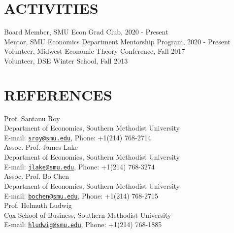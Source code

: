 \documentclass[11pt]{res}
\begin{document}
\begin{resume}
\section{ACTIVITIES}\vspace{2mm}
Board Member, SMU Econ Grad Club, 2020 - Present\vspace{1.5mm}\\
Mentor, SMU Economics Department Mentorship Program, 2020 - Present\vspace{1.5mm}\\
Volunteer, Midwest Economic Theory Conference, Fall 2017\vspace{1.5mm}\\
Volunteer, DSE Winter School, Fall 2013

\section{REFERENCES}\vspace{2mm}
Prof. Santanu Roy\\
Department of Economics, Southern Methodist University\\
E-mail: \href{mailto:sroy@smu.edu}{\texttt{sroy@smu.edu}}, Phone: +1(214) 768-2714\\

\vspace{-5 mm} Assoc. Prof. James Lake\\
Department of Economics, Southern Methodist University\\
E-mail: \href{mailto:jlake@smu.edu}{\texttt{jlake@smu.edu}}, Phone: +1(214) 768-3274\\

\vspace{-5 mm} Assoc. Prof. Bo Chen\\
Department of Economics, Southern Methodist University\\
E-mail: \href{mailto:bochen@smu.edu}{\texttt{bochen@smu.edu}}, Phone: +1(214) 768-2715\\

\vspace{-5 mm} Prof. Helmuth Ludwig\\
Cox School of Business, Southern Methodist University\\
E-mail: \href{mailto:hludwig@smu.edu}{\texttt{hludwig@smu.edu}}, Phone: +1(214) 768-1885\\






\end{resume}
\end{document}
